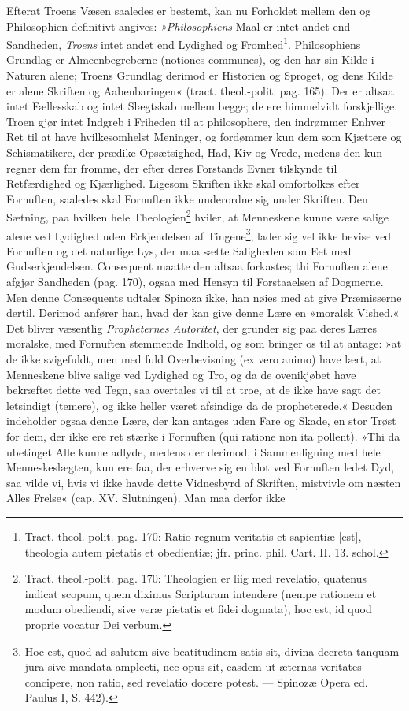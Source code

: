 \documentclass[12pt,a4paper]{book}
\newcommand{\opage}[1]{\marginnote{\footnotesize\textit{[#1]}}}
\begin{document}
Efterat Troens Væsen saaledes er bestemt, kan nu Forholdet mellem den og Philosophien definitivt angives: \emph{»Philosophiens} Maal er intet andet end Sandheden, \emph{Troens} intet andet end Lydighed og Fromhed\footnote{Tract. theol.-polit. pag. 170: Ratio regnum veritatis et sapientiæ [est], theologia autem pietatis et obedientiæ; jfr. princ. phil. Cart. II. 13. schol.}. Philosophiens Grundlag er Almeenbegreberne (notiones communes), og den har sin Kilde i Naturen alene; Troens Grundlag derimod er Historien og Sproget, og dens Kilde er alene Skriften og Aabenbaringen« (tract. theol.-polit. pag. 165). Der er altsaa intet Fællesskab og intet Slægtskab mellem begge; de ere himmelvidt forskjellige. Troen gjør intet Indgreb i Friheden til at philosophere, den indrømmer Enhver Ret til at have hvilkesomhelst Meninger, og fordømmer kun dem som Kjættere og Schismatikere, der prædike Opsætsighed, Had, Kiv og Vrede, medens den kun regner dem for fromme,
\opage{158} \setcounter{footnote}{0}%
der efter deres Forstands Evner tilskynde til Retfærdighed og Kjærlighed. Ligesom Skriften ikke skal omfortolkes efter Fornuften, saaledes skal Fornuften ikke underordne sig under Skriften. Den Sætning, paa hvilken hele Theologien\footnote{Tract. theol.-polit. pag. 170: Theologien er liig med revelatio, quatenus indicat scopum, quem diximus Scripturam intendere (nempe rationem et modum obediendi, sive veræ pietatis et fidei dogmata), hoc est, id quod proprie vocatur Dei verbum.} hviler, at Menneskene kunne være salige alene ved Lydighed uden Erkjendelsen af Tingene\footnote{Hoc est, quod ad salutem sive beatitudinem satis sit, divina decreta tanquam jura sive mandata amplecti, nec opus sit, easdem ut æternas veritates concipere, non ratio, sed revelatio docere potest. --- Spinozæ Opera ed. Paulus I, S. 442).}, lader sig vel ikke bevise ved Fornuften og det naturlige Lys, der maa sætte Saligheden som Eet med Gudserkjendelsen. Consequent maatte den altsaa forkastes; thi Fornuften alene afgjør Sandheden (pag. 170), ogsaa med Hensyn til Forstaaelsen af Dogmerne. Men denne Consequents udtaler Spinoza ikke, han nøies med at give Præmisserne dertil. Derimod anfører han, hvad der kan give denne Lære en »moralsk Vished.« Det bliver væsentlig \emph{Propheternes Autoritet}, der grunder sig paa deres Læres moralske, med Fornuften stemmende Indhold, og som bringer os til at antage: »at de ikke svigefuldt, men med fuld Overbevisning (ex vero animo) have lært, at Menneskene blive salige ved Lydighed og Tro, og da de ovenikjøbet have bekræftet dette ved Tegn, saa overtales vi til at troe, at de ikke have sagt det letsindigt (temere), og ikke heller været afsindige da de propheterede.« Desuden indeholder ogsaa denne Lære, der kan antages uden Fare og Skade, en stor Trøst for dem, der ikke ere ret stærke i Fornuften (qui ratione non ita pollent). »Thi da ubetinget Alle kunne adlyde, medens der derimod, i Sammenligning med hele Menneskeslægten, kun ere faa, der erhverve sig en blot ved Fornuften ledet Dyd, saa vilde vi, hvis vi ikke havde dette Vidnesbyrd af Skriften, mistvivle om næsten Alles Frelse« (cap. XV. Slutningen). Man maa derfor ikke
\end{document}
